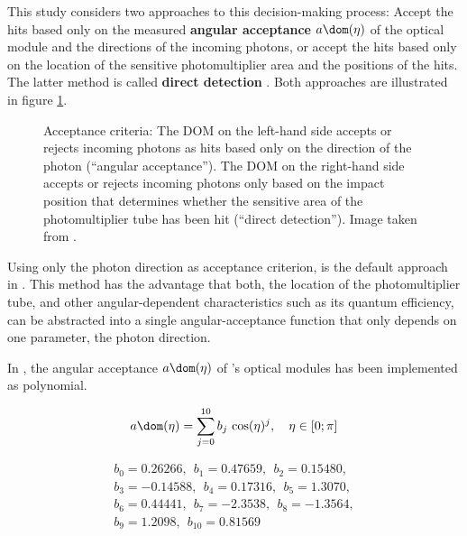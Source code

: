This study considers two approaches to this decision-making process: Accept the hits based only on the measured \textbf{angular acceptance} $a\dom(\eta)$ of the optical module and the directions of the incoming photons, or accept the hits based only on the location of the sensitive photomultiplier area and the positions of the hits. The latter method is called \textbf{direct detection} \cite{martinspicehddard}. Both approaches are illustrated in figure \ref{fig:kieQuoh1}.

\begin{figure}[htbp]
  \centering
  \caption{Acceptance criteria: The DOM on the left-hand side accepts or rejects incoming photons as hits based only on the direction of the photon (``angular acceptance''). The DOM on the right-hand side accepts or rejects incoming photons only based on the impact position that determines whether the sensitive area of the photomultiplier tube has been hit (``direct detection''). Image taken from \cite[slide 17]{martinspicehddard}.}
  \label{fig:kieQuoh1}
\end{figure}

Using only the photon direction as acceptance criterion, is the default approach in \clsim. This method has the advantage that both, the location of the photomultiplier tube, and other angular-dependent characteristics such as its quantum efficiency, can be abstracted into a single angular-acceptance function that only depends on one parameter, the photon direction.

In \clsim, the angular acceptance $a\dom(\eta)$ of \icecube's optical modules has been implemented as polynomial.

\begin{equation}
  a\dom(\eta) = \sum_{j = 0}^{10} b_j\,\cos(\eta)^j, \ \ \ \eta \in [0; \pi]
  \label{eq:anominal}
\end{equation}

\begin{gather*}
   b_0 =  0.26266,  \ \  b_1    =  0.47659,   \ \ b_2 =  0.15480,  \\
   b_3 = -0.14588,  \ \  b_4    =  0.17316,   \ \ b_5 =  1.3070,   \\
   b_6 =  0.44441,  \ \  b_7    = -2.3538,    \ \ b_8 = -1.3564,   \\
   b_9 =  1.2098,   \ \  b_{10} =  0.81569
\end{gather*}


